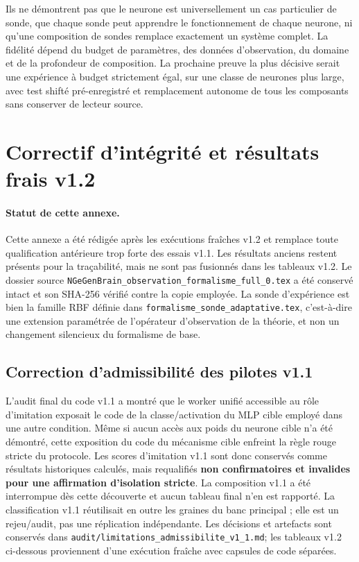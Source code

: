 \documentclass[11pt,a4paper]{article}
\begin{document}
Ils ne démontrent pas que le neurone est universellement un cas particulier de sonde, que chaque sonde peut apprendre le fonctionnement de chaque neurone, ni qu'une composition de sondes remplace exactement un système complet. La fidélité dépend du budget de paramètres, des données d'observation, du domaine et de la profondeur de composition. La prochaine preuve la plus décisive serait une expérience à budget strictement égal, sur une classe de neurones plus large, avec test shifté pré-enregistré et remplacement autonome de tous les composants sans conserver de lecteur source.


\clearpage
\appendix
\section{Correctif d'intégrité et résultats frais v1.2}
\label{app:v12}

\paragraph{Statut de cette annexe.} Cette annexe a été rédigée après les exécutions fraîches v1.2 et remplace toute qualification antérieure trop forte des essais v1.1. Les résultats anciens restent présents pour la traçabilité, mais ne sont pas fusionnés dans les tableaux v1.2. Le dossier source \texttt{NGeGenBrain\_observation\_formalisme\_full\_0.tex} a été conservé intact et son SHA-256 vérifié contre la copie employée. La sonde d'expérience est bien la famille RBF définie dans \texttt{formalisme\_sonde\_adaptative.tex}, c'est-à-dire une extension paramétrée de l'opérateur d'observation de la théorie, et non un changement silencieux du formalisme de base.

\subsection{Correction d'admissibilité des pilotes v1.1}
L'audit final du code v1.1 a montré que le worker unifié accessible au rôle d'imitation exposait le code de la classe/activation du MLP cible employé dans une autre condition. Même si aucun accès aux poids du neurone cible n'a été démontré, cette exposition du code du mécanisme cible enfreint la règle rouge stricte du protocole. Les scores d'imitation v1.1 sont donc conservés comme résultats historiques calculés, mais requalifiés \textbf{non confirmatoires et invalides pour une affirmation d'isolation stricte}. La composition v1.1 a été interrompue dès cette découverte et aucun tableau final n'en est rapporté. La classification v1.1 réutilisait en outre les graines du banc principal ; elle est un rejeu/audit, pas une réplication indépendante. Les décisions et artefacts sont conservés dans \texttt{audit/limitations\_admissibilite\_v1\_1.md}; les tableaux v1.2 ci-dessous proviennent d'une exécution fraîche avec capsules de code séparées.
\end{document}

